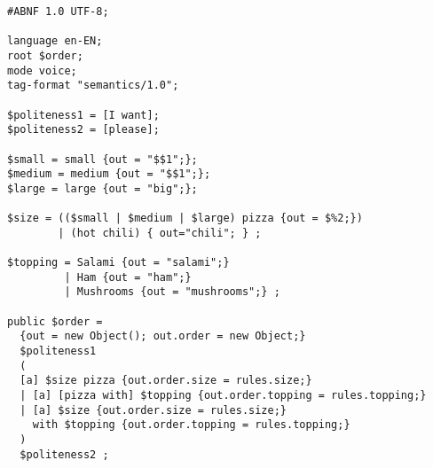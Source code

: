 {\small\begin{verbatim}
#ABNF 1.0 UTF-8;

language en-EN;
root $order;
mode voice;
tag-format "semantics/1.0";

$politeness1 = [I want];
$politeness2 = [please];

$small = small {out = "$$1";};
$medium = medium {out = "$$1";};
$large = large {out = "big";};

$size = (($small | $medium | $large) pizza {out = $%2;})
        | (hot chili) { out="chili"; } ;

$topping = Salami {out = "salami";}
         | Ham {out = "ham";}
         | Mushrooms {out = "mushrooms";} ;

public $order =
  {out = new Object(); out.order = new Object;}
  $politeness1
  (
  [a] $size pizza {out.order.size = rules.size;}
  | [a] [pizza with] $topping {out.order.topping = rules.topping;}
  | [a] $size {out.order.size = rules.size;}
    with $topping {out.order.topping = rules.topping;}
  )
  $politeness2 ;
\end{verbatim}}

